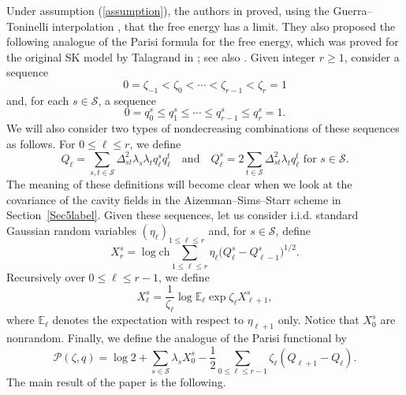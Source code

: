 \documentclass[aop,MSNbibl,dvips]{arximspdf}
\def\cal{\mathscr}
\newcommand{\spe}{{\cal S}}
\newcommand{\PP}{{\cal P}}
\newcommand{\ch}{\mathrm{ch}}
\newcommand{\smsp}{}
\newcommand{\e}{\mathbb{E}}
\begin{document}
Under assumption (\ref{assumption}), the authors in \cite{MS} proved,
using the Guerra--Toninelli interpolation \cite{GuerraToninelli}, that
the free energy has a limit. They also proposed the following analogue
of the Parisi formula \cite{Parisi79,Parisi} for the free energy,
which was proved for the original SK model by Talagrand in \cite{TPF};
see also \cite{SG2}. Given integer $r\geq1$, consider a sequence
%
\begin{equation}
0=\zeta_{-1}< \zeta_0 <\cdots< \zeta_{r-1} <
\zeta_r = 1 \label{zetas}
\end{equation}
%
and, for each $s\in\spe$, a sequence
%
\begin{equation}
0=q^s_0\leq q^s_1 \leq\cdots
\leq q^s_{r-1}\leq q^s_r =1.
\label{qs}
\end{equation}
%
We will also consider two types of nondecreasing combinations of these
sequences as follows. For $0\leq\ell\leq r$, we define
%
\begin{equation}
Q_\ell= \sum_{s,t\in\spe} \Delta_{st}^2
\lambda_s \lambda_t q^s_\ell
q^t_\ell \quad\mbox{and}\quad Q^s_\ell= 2\sum
_{t\in\spe} \Delta_{st}^2
\lambda_t q^t_\ell \mbox{ for } s\in\spe.
\label{Qs}
\end{equation}
%
The meaning of these definitions will become clear when we look at the
covariance of the cavity fields in the Aizenman--Sims--Starr scheme in
Section~\ref{Sec5label}. Given these sequences, let us consider i.i.d.
standard Gaussian random variables $(\eta_\ell)_{1\leq\ell\leq r}$
and, for $s\in\spe$, define
%
\begin{equation}
X^s_r = \log\ch\smsp \sum_{1\leq\ell\leq r}
\eta_\ell \bigl(Q^s_{\ell} - Q^s_{\ell
-1}
\bigr)^{1/2}. \label{Xr}
\end{equation}
%
Recursively over $0\leq\ell\leq r-1$, we define
%
\begin{equation}
X^s_\ell=\frac{1}{\zeta_\ell}\log\e_\ell\exp
\zeta_\ell X^s_{\ell+1}, \label{Xelll}
\end{equation}
%
where $\e_\ell$ denotes the expectation with respect to $\eta_{\ell+1}$
only. Notice that $X^s_0$ are nonrandom. Finally, we define the
analogue of the Parisi functional by
%
\begin{equation}
\PP(\zeta,q) = \log2 + \sum_{s\in\spe}
\lambda_s X^s_0 -\frac{1}{2} \sum
_{0\leq\ell\leq r-1} \zeta_\ell (Q_{\ell+1} -
Q_{\ell
} ). \label{Pzeta}
\end{equation}
%
The main result of the paper is the following.
\end{document}
